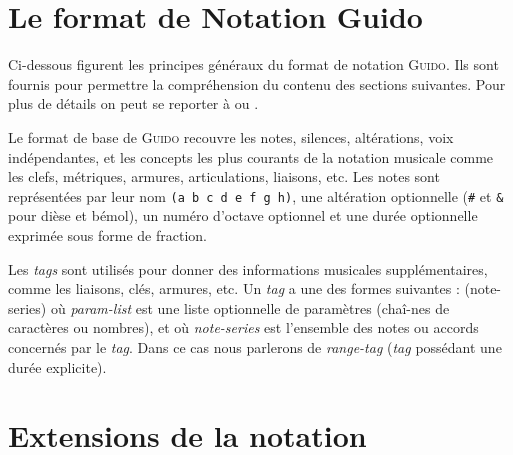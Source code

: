 \documentclass{article}
\newenvironment{gmncode}	{\vspace{-2mm}\small\verbatim}{\endverbatim\vspace{-2mm}}
\newcommand{\guido}			{\textsc{Guido}}
\newcommand{\code}[1]		{{\small \texttt{#1}}}
\begin{document}
\section{Le format de Notation Guido}\label{sec:format_notation}

Ci-dessous figurent les principes généraux du format de notation \guido{}. Ils sont fournis pour permettre la compréhension du contenu des sections suivantes. Pour plus de détails on peut se reporter à \cite{Dau09a} ou \cite{guido}.

Le format de base de \guido{} recouvre les notes, silences, altérations, voix indépendantes, et les concepts les plus courants de la notation musicale comme les clefs, métriques, armures, articulations, liaisons, etc.
Les notes sont représentées par leur nom \code{(a b c d e f g h)}, une altération optionnelle (\code{\#} et \code{\&} pour dièse et bémol), un numéro d'octave optionnel et une durée optionnelle exprimée sous forme de fraction.



Les \emph{tags} sont utilisés pour donner des informations musicales supplémentaires, comme les liaisons, clés, armures, etc. Un \emph{tag} a une des formes suivantes : 
\begin{gmncode}
    (note-series)
\end{gmncode}
où \emph{param-list} est une liste optionnelle de paramètres (chaî-nes de caractères ou nombres), et où \emph{note-series} est l'ensemble des notes ou accords concernés par le \emph{tag}. Dans ce cas nous parlerons de \emph{range-tag} (\emph{tag} possédant une durée explicite).


\section{Extensions de la notation}\label{sec:extension}
\end{document}
